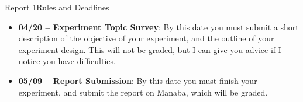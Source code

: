 \documentclass[aspectratio=169]{beamer}
\begin{document}
\begin{CJK}{UTF8}{ipxm}
\begin{frame}{Report 1}{Rules and Deadlines}
  \begin{itemize}
    \item {\bf 04/20 -- Experiment Topic Survey}: By this date you must submit a short description of the objective of your experiment, and the outline of your experiment design. This will not be graded, but I can give you advice if I notice you have difficulties.\bigskip

    \item {\bf 05/09 -- Report Submission}: By this date you must finish your experiment, and submit the report on Manaba, which will be graded.
  \end{itemize}
\end{frame}




\end{CJK}
\end{document}
